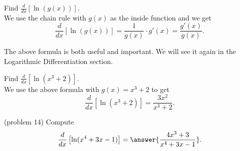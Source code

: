 \documentclass[handout]{ximera}
\begin{document}
\begin{example}[example 14]
Find $\frac{d}{dx} \left[\ln(g(x))\right]$.\\
We use the chain rule with $g(x)$ as the inside function and we get
\[
\frac{d}{dx} \left[\ln(g(x))\right] = \frac{1}{g(x)}\cdot g'(x) = \frac{g'(x)}{g(x)}.
\]
\end{example}

The above formula is both useful and important.  We will see it again in the Logarithmic Differentiation section.

\begin{example}
 Find $\frac{d}{dx} \left[\ln(x^3 + 2)\right]$.\\
 
We use the above formula with $g(x) = x^3 + 2$ to get
\[
\frac{d}{dx} \left[\ln(x^3 + 2)\right] = \frac{3x^2}{x^3 + 2}.
\]
\end{example}

\begin{problem}(problem 14)
Compute 
\[
\frac{d}{dx} \left[\ln(x^4 + 3x - 1)\right] = \answer{\frac{4x^3 + 3}{x^4 + 3x -1}}.
\]
\end{problem}

\begin{center}
\begin{foldable}
\end{foldable}
\end{center}
\end{document}
